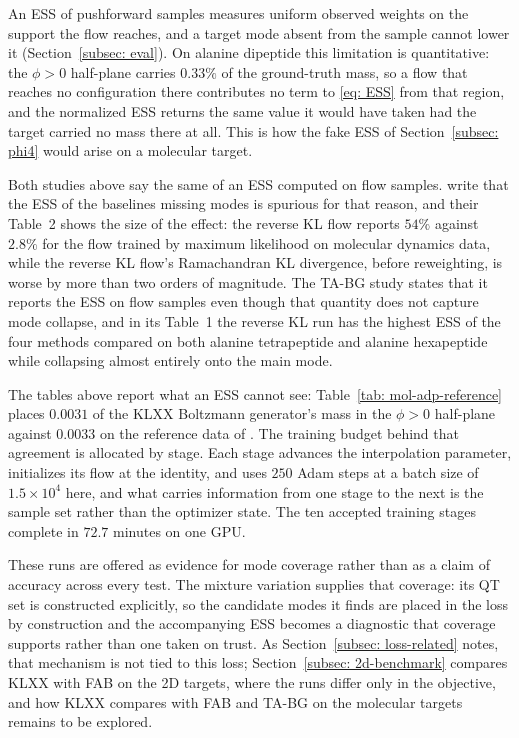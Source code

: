 \documentclass{article}
\begin{document}
{\color{blue}An ESS of pushforward samples measures uniform observed weights on the support the flow reaches, and a target mode absent from the sample cannot lower it (Section~\ref{subsec: eval}). On alanine dipeptide this limitation is quantitative: the \(\phi>0\) half-plane carries \(0.33\%\) of the ground-truth mass, so a flow that reaches no configuration there contributes no term to \eqref{eq: ESS} from that region, and the normalized ESS returns the same value it would have taken had the target carried no mass there at all. This is how the fake ESS of Section~\ref{subsec: phi4} would arise on a molecular target.}

{\color{blue}Both studies above say the same of an ESS computed on flow samples. \citet{midgley2022flow} write that the ESS of the baselines missing modes is spurious for that reason, and their Table~2 shows the size of the effect: the reverse KL flow reports \(54\%\) against \(2.8\%\) for the flow trained by maximum likelihood on molecular dynamics data, while the reverse KL flow's Ramachandran KL divergence, before reweighting, is worse by more than two orders of magnitude. The TA-BG study \citep{schopmans2025temperature} states that it reports the ESS on flow samples even though that quantity does not capture mode collapse, and in its Table~1 the reverse KL run has the highest ESS of the four methods compared on both alanine tetrapeptide and alanine hexapeptide while collapsing almost entirely onto the main mode.}

{\color{blue}The tables above report what an ESS cannot see: Table~\ref{tab: mol-adp-reference} places \(0.0031\) of the KLXX Boltzmann generator's mass in the \(\phi>0\) half-plane against \(0.0033\) on the reference data of \citet{midgley2022flow}. The training budget behind that agreement is allocated by stage. Each stage advances the interpolation parameter, initializes its flow at the identity, and uses \(250\) Adam steps at a batch size of \(1.5\times10^4\) here, and what carries information from one stage to the next is the sample set rather than the optimizer state. The ten accepted training stages complete in \(72.7\) minutes on one GPU.}

{\color{blue}These runs are offered as evidence for mode coverage rather than as a claim of accuracy across every test. The mixture variation supplies that coverage: its QT set is constructed explicitly, so the candidate modes it finds are placed in the loss by construction and the accompanying ESS becomes a diagnostic that coverage supports rather than one taken on trust. As Section~\ref{subsec: loss-related} notes, that mechanism is not tied to this loss; Section~\ref{subsec: 2d-benchmark} compares KLXX with FAB on the 2D targets, where the runs differ only in the objective, and how KLXX compares with FAB and TA-BG on the molecular targets remains to be explored.}
\end{document}
